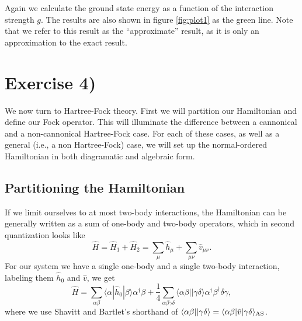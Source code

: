 \documentclass[a4paper, 11pt, notitlepage, english]{article}
\newcommand{\brakket}[2]{\langle #1 || #2 \rangle}
\newcommand{\op}[1]{\hat{#1}}
\newcommand{\braopket}[3]{\langle #1 | {#2} | #3 \rangle}
\begin{document}
Again we calculate the ground state energy as a function of the interaction strength $g$. The results are also shown in figure \ref{fig:plot1} as the green line. Note that we refer to this result as the ``approximate'' result, as it is only an approximation to the exact result.

\clearpage

\section*{Exercise 4)}

We now turn to Hartree-Fock theory. First we will partition our Hamiltonian and define our Fock operator. This will illuminate the difference between a cannonical and a non-cannonical Hartree-Fock case. For each of these cases, as well as a general (i.e., a non Hartree-Fock) case, we will set up the normal-ordered Hamiltonian in both diagramatic and algebraic form.


\subsection*{Partitioning the Hamiltonian}

If we limit ourselves to at most two-body interactions, the Hamiltonian can be generally written as a sum of one-body and two-body operators, which in second quantization looks like
$$\op{H} = \op{H}_1 + \op{H}_2 = \sum_\mu \op{h}_\mu + \sum_{\mu\nu} \op{v}_{\mu\nu}.$$
For our system we have a single one-body and a single two-body interaction, labeling them $\op{h}_0$ and $\op{v}$, we get
$$\op{H} = \sum_{\alpha\beta} \braopket{\alpha}{\op{h}_0}{\beta}\alpha^\dagger \beta + \frac{1}{4}\sum_{\alpha\beta\gamma\delta}\brakket{\alpha\beta}{\gamma\delta}\alpha^\dagger \beta^\dagger \delta \gamma,$$
where we use Shavitt and Bartlet's shorthand of $\brakket{\alpha\beta}{\gamma\delta} = \braopket{\alpha\beta}{\op{v}}{\gamma\delta}_{\rm AS}$.
\end{document}
